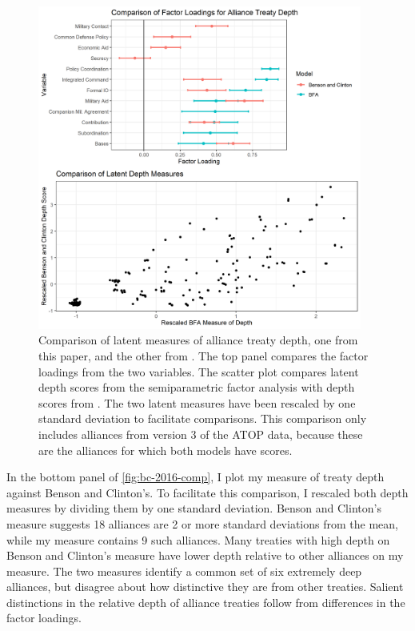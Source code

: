 \documentclass[12pt]{article}
\begin{document}
\begin{figure}[htbp]
	\centering
		\includegraphics[width=0.95\textwidth]{bc-2016-comp.png}
	\caption{Comparison of latent measures of alliance treaty depth, one from this paper, and the other from \citet{BensonClinton2016}. The top panel compares the factor loadings from the two variables. The scatter plot compares latent depth scores from the semiparametric factor analysis with depth scores from \citet{BensonClinton2016}. The two latent measures have been rescaled by one standard deviation to facilitate comparisons. This comparison only includes alliances from version 3 of the ATOP data, because these are the alliances for which both models have scores.}
	\label{fig:bc-2016-comp}
\end{figure}


In the bottom panel of \autoref{fig:bc-2016-comp}, I plot my measure of treaty depth against Benson and Clinton's. 
To facilitate this comparison, I rescaled both depth measures by dividing them by one standard deviation.
Benson and Clinton's measure suggests 18 alliances are 2 or more standard deviations from the mean, while my measure contains 9 such alliances. 
Many treaties with high depth on Benson and Clinton's measure have lower depth relative to other alliances on my measure.
The two measures identify a common set of six extremely deep alliances, but disagree about how distinctive they are from other treaties. 
Salient distinctions in the relative depth of alliance treaties follow from differences in the factor loadings. 
\end{document}
